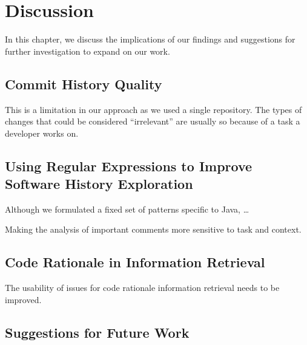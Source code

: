 \chapter{Discussion}
\label{ch:Discussion}

In this chapter, we discuss the implications of our findings and suggestions for further investigation to expand on our work.


\section{Commit History Quality}

This is a limitation in our approach as we used a single repository.
The types of changes that could be considered ``irrelevant'' are usually so because of a task a developer works on.


\section{Using Regular Expressions to Improve Software History Exploration}

Although we formulated a fixed set of patterns specific to Java, \dots {}

Making the analysis of important comments more sensitive to task and context.


\section{Code Rationale in Information Retrieval}

The usability of issues for code rationale information retrieval needs to be improved.


\section{Suggestions for Future Work}

\endinput

Any text after an \endinput is ignored.
You could put scraps here or things in progress.